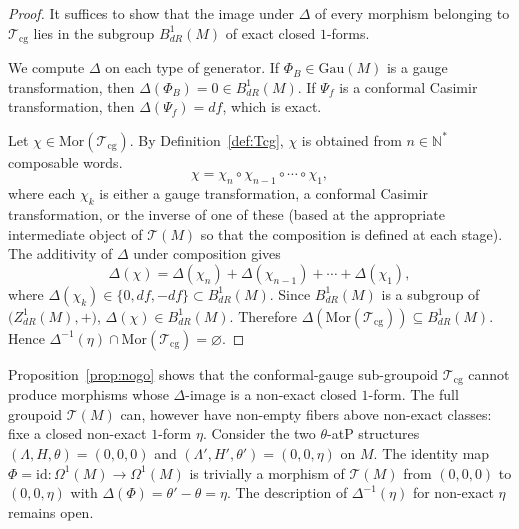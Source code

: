 \documentclass[11pt,a4paper]{article}
\theoremstyle{plain}
\theoremstyle{definition}
\theoremstyle{remark}
\begin{document}
\begin{proof}
	It suffices to show that the image under $\Delta$ of every morphism belonging to $\mathcal{T}_{\mathrm{cg}}$ lies in the
	subgroup $B^1_{dR}(M)$ of exact closed $1$-forms.
	
	We compute  $\Delta$ on each type of generator. If
	$\Phi_B \in \mathrm{Gau}(M)$ is a gauge transformation, then $\Delta(\Phi_B) = 0 \in B^1_{dR}(M)$. If $\Psi_f$ is a conformal Casimir transformation, then
	$\Delta(\Psi_f) = df$, which is exact.
	
	Let $\chi \in \mathrm{Mor}(\mathcal{T}_{\mathrm{cg}})$. By Definition~\ref{def:Tcg}, $\chi$ is obtained from $n \in \mathbb{N}^*$
	composable words.
	$$
	\chi = \chi_n \circ \chi_{n-1} \circ \cdots \circ \chi_1,
	$$
	where each $\chi_k$ is either a gauge transformation, a conformal Casimir transformation, or the
	inverse of one of these (based at the appropriate intermediate object of $\mathcal{T}(M)$ so that the
	composition is defined at each stage). The additivity of $\Delta$ under
	composition gives
	$$
	\Delta(\chi) = \Delta(\chi_n) + \Delta(\chi_{n-1}) + \cdots + \Delta(\chi_1),
	$$
	where $\Delta(\chi_k)\in\{0,df,-df\}\subset B^1_{dR}(M)$. Since
	$B^1_{dR}(M)$ is a subgroup of $\bigl(Z^1_{dR}(M), +\bigr)$,  $\Delta(\chi) \in B^1_{dR}(M)$.
	Therefore  $\Delta(\mathrm{Mor}(\mathcal{T}_{\mathrm{cg}})) \subseteq B^1_{dR}(M)$. Hence $\Delta^{-1}(\eta) \cap \mathrm{Mor}(\mathcal{T}_{\mathrm{cg}}) = \varnothing$.
\end{proof}

Proposition~\ref{prop:nogo} shows that the conformal-gauge
sub-groupoid $\mathcal{T}_{\mathrm{cg}}$ cannot produce morphisms whose $\Delta$-image is a non-exact closed $1$-form. The full groupoid $\mathcal{T}(M)$ can, however have 
non-empty fibers above non-exact classes: fixe a closed  non-exact $1$-form $\eta$. Consider the two $\theta$-atP structures
$(\Lambda, H, \theta) = (0, 0, 0)$ and $(\Lambda', H', \theta') = (0, 0, \eta)$ on $M$. The identity map $\Phi = \mathrm{id}: \Omega^1(M) \longrightarrow \Omega^1(M)$ is
trivially a morphism of $\mathcal{T}(M)$ from $(0, 0, 0)$ to $(0, 0, \eta)$ with $\Delta(\Phi) = \theta' - \theta = \eta$. The  description of 
$\Delta^{-1}(\eta)$ for non-exact $\eta$ remains  open.
\end{document}
